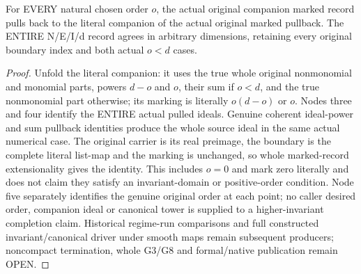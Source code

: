 \begin{theorem}
\label{hir:submersion-relative-parts-actual-whole-companion}
\leanok
For EVERY natural chosen order $o$, the actual original companion marked
record pulls back to the literal companion of the actual original marked
pullback. The ENTIRE N/E/I/d record agrees in arbitrary dimensions,
retaining every original boundary index and both actual $o<d$ cases.
\end{theorem}
\begin{proof}
Unfold the literal companion: it uses the true whole original nonmonomial
and monomial parts, powers $d-o$ and $o$, their sum if $o<d$, and the true
nonmonomial part otherwise; its marking is literally $o(d-o)$ or $o$.
Nodes three and four identify the ENTIRE actual pulled ideals. Genuine
coherent ideal-power and sum pullback identities produce the whole source
ideal in the same actual numerical case. The original carrier is its real
preimage, the boundary is the complete literal list-map and the marking
is unchanged, so whole marked-record extensionality gives the identity.
This includes $o=0$ and mark zero literally and does not claim they satisfy
an invariant-domain or positive-order condition. Node five separately
identifies the genuine original order at each point; no caller desired
order, companion ideal or canonical tower is supplied to a higher-invariant
completion claim. Historical regime-run comparisons and full constructed
invariant/canonical driver under smooth maps remain subsequent producers;
noncompact termination, whole G3/G8 and formal/native publication remain OPEN.
\end{proof}
